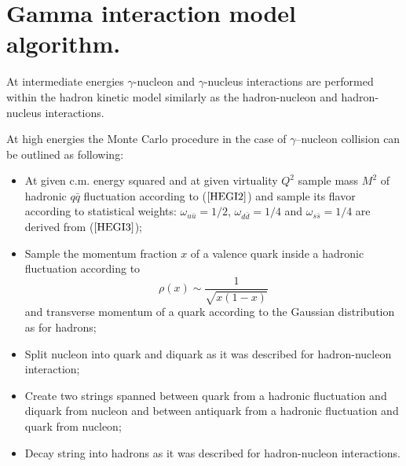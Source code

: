 \section{Gamma interaction model algorithm.}

\hspace{1.0em}
At intermediate energies $\gamma$-nucleon and $\gamma$-nucleus interactions are 
performed within the hadron kinetic model similarly as the hadron-nucleon and 
hadron-nucleus interactions. 

At high energies the Monte Carlo procedure
 in the case of $\gamma$--nucleon collision can be 
outlined as following:
\begin{itemize}
\item At given c.m. energy squared and at given virtuality $Q^2$ sample 
mass $M^2$ of 
hadronic $q\bar{q}$ fluctuation according to ($\ref{HEGI2}$) 
and sample its flavor 
according to statistical weights: $\omega_{u\bar{u}}= 1/2$, 
$\omega_{d\bar{d}}= 1/4$ and $\omega_{s\bar{s}}= 1/4$ are derived from 
($\ref{HEGI3}$);
\item Sample the momentum fraction $x$ of a valence quark inside
 a hadronic fluctuation 
according to 
\begin{equation}
\label{GIMA1} \rho(x) \sim \frac{1}{\sqrt{x(1-x)}}
\end{equation}
and transverse momentum of a quark according to the Gaussian 
distribution as for hadrons;
\item Split nucleon into quark and diquark as it was described
 for hadron-nucleon 
interaction;
\item Create two strings spanned between quark from a hadronic fluctuation and 
diquark from nucleon and between antiquark from a hadronic
 fluctuation and quark from nucleon;
\item Decay string into hadrons as it was described for
 hadron-nucleon interactions.
\end{itemize}

